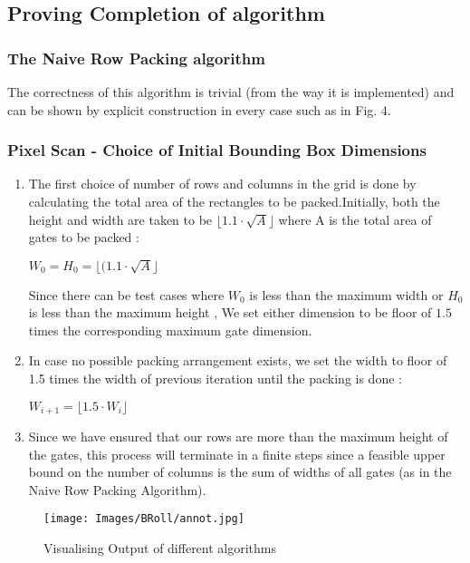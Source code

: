 \documentclass[12pt, a4paper,openany]{article}
\begin{document}
\subsection{Proving Completion of algorithm}
\subsubsection{The Naive Row Packing algorithm}
\begin{flushleft}
    The correctness of this algorithm is trivial (from the way it is implemented) and can be shown by explicit construction in every case such as in Fig. 4.
\end{flushleft}
\subsubsection{Pixel Scan - Choice of Initial Bounding Box Dimensions}
\begin{enumerate}
    \item The first choice of number of rows and columns in the grid is done by calculating the total area of the rectangles to be packed.Initially, both the height and width are taken to be $\lfloor 1.1 \cdot \sqrt{A} \rfloor$ where A is the total area of gates to be packed :
    \begin{center}
         $W_{0}=H_{0}=\lfloor(1.1\cdot\sqrt{A} \rfloor$
    \end{center}
    Since there can be test cases where $W_{0}$ is less than the maximum width or $H_{0}$ is less than the maximum height , We set either dimension to be floor of \(1.5\) times the corresponding maximum gate dimension.
    \item In case no possible packing arrangement exists, we set the width to floor of 1.5 times the width of previous iteration until the packing is done :
    \begin{center}
        $W_{i+1}=\lfloor 1.5 \cdot W_{i} \rfloor$ 
    \end{center}
    \item Since we  have ensured that our rows are more than the maximum height of the gates, this process will terminate in a finite steps since a feasible upper bound on the number of columns is the sum of widths of all gates (as in the Naive Row Packing Algorithm).
\end{enumerate}

\begin{figure}[ht]
    \centering
    \begin{minipage}{.6\textwidth}
          \centering
          \texttt{[image: Images/BRoll/annot.jpg]}
          \label{fig:annot-1}
          \caption{Visualising Output of different algorithms}
          
               
    \end{minipage}
\end{figure}
\end{document}
